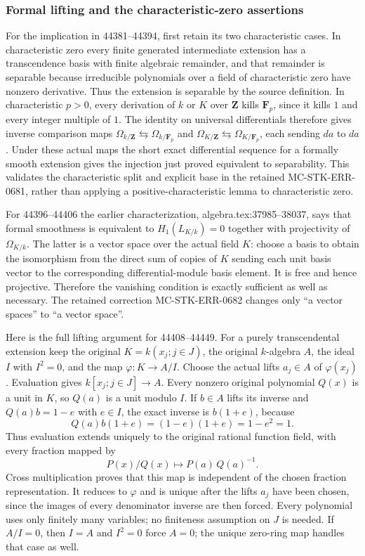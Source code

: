 \subsubsection{Formal lifting and the characteristic-zero assertions}\label{algebra-proof-063-formal-lifting-and-the-characteristic-zero-assertions}

For the implication in 44381--44394, first retain its two characteristic cases. In characteristic zero every finite generated intermediate extension has a transcendence basis with finite algebraic remainder, and that remainder is separable because irreducible polynomials over a field of characteristic zero have nonzero derivative. Thus the extension is separable by the source definition. In characteristic \(p>0\), every derivation of \(k\) or \(K\) over \(\mathbf Z\) kills \(\mathbf F_p\), since it kills \(1\) and every integer multiple of \(1\). The identity on universal differentials therefore gives inverse comparison maps \(\Omega_{k/\mathbf Z}\leftrightarrows\Omega_{k/\mathbf F_p}\) and \(\Omega_{K/\mathbf Z}\leftrightarrows\Omega_{K/\mathbf F_p}\), each sending \(da\) to \(da\). Under these actual maps the short exact differential sequence for a formally smooth extension gives the injection just proved equivalent to separability. This validates the characteristic split and explicit base in the retained MC-STK-ERR-0681, rather than applying a positive-characteristic lemma to characteristic zero.

For 44396--44406 the earlier characterization, algebra.tex:37985--38037, says that formal smoothness is equivalent to \(H_1(L_{K/k})=0\) together with projectivity of \(\Omega_{K/k}\). The latter is a vector space over the actual field \(K\): choose a basis to obtain the isomorphism from the direct sum of copies of \(K\) sending each unit basis vector to the corresponding differential-module basis element. It is free and hence projective. Therefore the vanishing condition is exactly sufficient as well as necessary. The retained correction MC-STK-ERR-0682 changes only ``a vector spaces'' to ``a vector space''.

Here is the full lifting argument for 44408--44449. For a purely transcendental extension keep the original \(K=k(x_j;j\in J)\), the original \(k\)-algebra \(A\), the ideal \(I\) with \(I^2=0\), and the map \(\varphi:K\to A/I\). Choose the actual lifts \(a_j\in A\) of \(\varphi(x_j)\). Evaluation gives \(k[x_j;j\in J]\to A\). Every nonzero original polynomial \(Q(x)\) is a unit in \(K\), so \(Q(a)\) is a unit modulo \(I\). If \(b\in A\) lifts its inverse and \(Q(a)b=1-e\) with \(e\in I\), the exact inverse is \(b(1+e)\), because \[
 Q(a)b(1+e)=(1-e)(1+e)=1-e^2=1.
\] Thus evaluation extends uniquely to the original rational function field, with every fraction mapped by \[
 P(x)/Q(x)\longmapsto P(a)\,Q(a)^{-1}.
\] Cross multiplication proves that this map is independent of the chosen fraction representation. It reduces to \(\varphi\) and is unique after the lifts \(a_j\) have been chosen, since the images of every denominator inverse are then forced. Every polynomial uses only finitely many variables; no finiteness assumption on \(J\) is needed. If \(A/I=0\), then \(I=A\) and \(I^2=0\) force \(A=0\); the unique zero-ring map handles that case as well.

